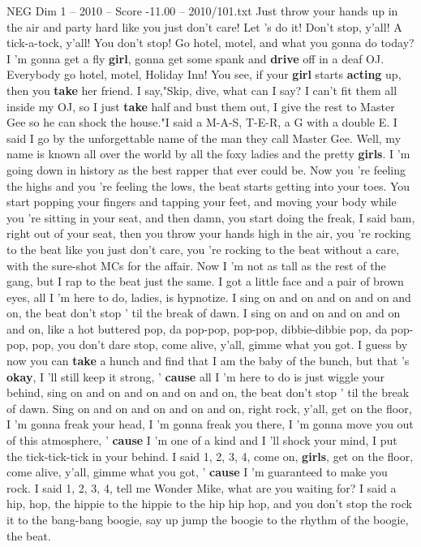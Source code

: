 \begin{textsample}{NEG Dim 1 – 2010 – Score -11.00 – 2010/101.txt}
Just throw your hands up in the air and party hard like you just don't care!
Let 's do it!
Don't stop, y'all!
A tick-a-tock, y'all!
You don't stop!
Go hotel, motel, and what you gonna do today?
I 'm gonna get a fly \textbf{girl}, gonna get some spank and \textbf{drive} off in a deaf OJ.
Everybody go hotel, motel, Holiday Inn!
You see, if your \textbf{girl} starts \textbf{acting} up, then you \textbf{take} her friend.
I say,"Skip, dive, what can I say?
I can't fit them all inside my OJ, so I just \textbf{take} half and bust them out, I give the rest to Master Gee so he can shock the house."I said a M-A-S, T-E-R, a G with a double E.
I said I go by the unforgettable name of the man they call Master Gee.
Well, my name is known all over the world by all the foxy ladies and the pretty \textbf{girls}.
I 'm going down in history as the best rapper that ever could be.
Now you 're feeling the highs and you 're feeling the lows, the beat starts getting into your toes.
You start popping your fingers and tapping your feet, and moving your body while you 're sitting in your seat, and then damn, you start doing the freak, I said bam, right out of your seat, then you throw your hands high in the air, you 're rocking to the beat like you just don't care, you 're rocking to the beat without a care, with the sure-shot MCs for the affair.
Now I 'm not as tall as the rest of the gang, but I rap to the beat just the same.
I got a little face and a pair of brown eyes, all I 'm here to do, ladies, is hypnotize.
I sing on and on and on and on and on, the beat don't stop ' til the break of dawn.
I sing on and on and on and on and on, like a hot buttered pop, da pop-pop, pop-pop, dibbie-dibbie pop, da pop-pop, pop, you don't dare stop, come alive, y'all, gimme what you got.
I guess by now you can \textbf{take} a hunch and find that I am the baby of the bunch, but that 's \textbf{okay}, I 'll still keep it strong, ' \textbf{cause} all I 'm here to do is just wiggle your behind, sing on and on and on and on and on, the beat don't stop ' til the break of dawn.
Sing on and on and on and on and on, right rock, y'all, get on the floor, I 'm gonna freak your head, I 'm gonna freak you there, I 'm gonna move you out of this atmosphere, ' \textbf{cause} I 'm one of a kind and I 'll shock your mind, I put the tick-tick-tick in your behind.
I said 1, 2, 3, 4, come on, \textbf{girls}, get on the floor, come alive, y'all, gimme what you got, ' \textbf{cause} I 'm guaranteed to make you rock.
I said 1, 2, 3, 4, tell me Wonder Mike, what are you waiting for?
I said a hip, hop, the hippie to the hippie to the hip hip hop, and you don't stop the rock it to the bang-bang boogie, say up jump the boogie to the rhythm of the boogie, the beat.

\end{textsample}
